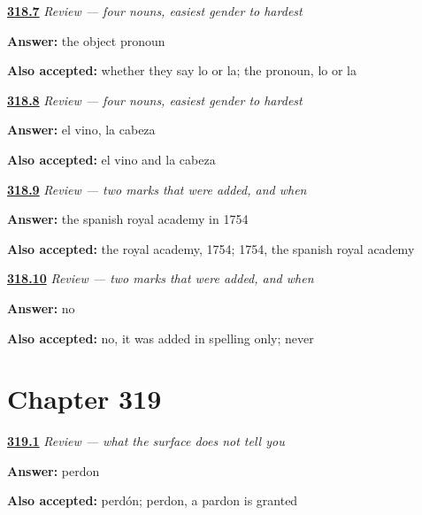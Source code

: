 \noindent\begin{minipage}[t]{\linewidth}
\raggedright
\hyperlink{review-ES-C318-repaso-genero-witness}{\textbf{318.7}} \emph{Review — four nouns, easiest gender to hardest}\par
\small \textbf{Answer:} the object pronoun\par
\footnotesize \textbf{Also accepted:} whether they say lo or la; the pronoun, lo or la
\end{minipage}\par\medskip

\noindent\begin{minipage}[t]{\linewidth}
\raggedright
\hyperlink{review-ES-C318-repaso-genero-wine}{\textbf{318.8}} \emph{Review — four nouns, easiest gender to hardest}\par
\small \textbf{Answer:} el vino, la cabeza\par
\footnotesize \textbf{Also accepted:} el vino and la cabeza
\end{minipage}\par\medskip

\noindent\begin{minipage}[t]{\linewidth}
\raggedright
\hyperlink{review-ES-C318-repaso-marcas-year}{\textbf{318.9}} \emph{Review — two marks that were added, and when}\par
\small \textbf{Answer:} the spanish royal academy in 1754\par
\footnotesize \textbf{Also accepted:} the royal academy, 1754; 1754, the spanish royal academy
\end{minipage}\par\medskip

\noindent\begin{minipage}[t]{\linewidth}
\raggedright
\hyperlink{review-ES-C318-repaso-marcas-h}{\textbf{318.10}} \emph{Review — two marks that were added, and when}\par
\small \textbf{Answer:} no\par
\footnotesize \textbf{Also accepted:} no, it was added in spelling only; never
\end{minipage}\par\medskip

\section*{Chapter 319}

\noindent\begin{minipage}[t]{\linewidth}
\raggedright
\hyperlink{review-ES-C319-repaso-la-superficie-sorry}{\textbf{319.1}} \emph{Review — what the surface does not tell you}\par
\small \textbf{Answer:} perdon\par
\footnotesize \textbf{Also accepted:} perdón; perdon, a pardon is granted
\end{minipage}\par\medskip

